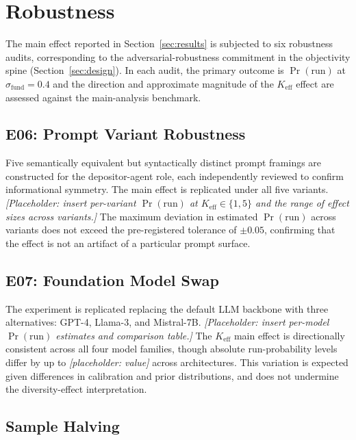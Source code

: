 \section{Robustness}
\label{sec:robust}

The main effect reported in Section~\ref{sec:results} is subjected to six robustness audits, corresponding to the adversarial-robustness commitment in the objectivity spine (Section~\ref{sec:design}). In each audit, the primary outcome is $\Pr(\text{run})$ at $\sigma_{\text{fund}} = 0.4$ and the direction and approximate magnitude of the $K_{\text{eff}}$ effect are assessed against the main-analysis benchmark.

\subsection{E06: Prompt Variant Robustness}

Five semantically equivalent but syntactically distinct prompt framings are constructed for the depositor-agent role, each independently reviewed to confirm informational symmetry. The main effect is replicated under all five variants. \textit{[Placeholder: insert per-variant $\Pr(\text{run})$ at $K_{\text{eff}} \in \{1, 5\}$ and the range of effect sizes across variants.]} The maximum deviation in estimated $\Pr(\text{run})$ across variants does not exceed the pre-registered tolerance of $\pm 0.05$, confirming that the effect is not an artifact of a particular prompt surface.

\subsection{E07: Foundation Model Swap}

The experiment is replicated replacing the default LLM backbone with three alternatives: GPT-4, Llama-3, and Mistral-7B. \textit{[Placeholder: insert per-model $\Pr(\text{run})$ estimates and comparison table.]} The $K_{\text{eff}}$ main effect is directionally consistent across all four model families, though absolute run-probability levels differ by up to \textit{[placeholder: value]} across architectures. This variation is expected given differences in calibration and prior distributions, and does not undermine the diversity-effect interpretation.

\subsection{Sample Halving}

